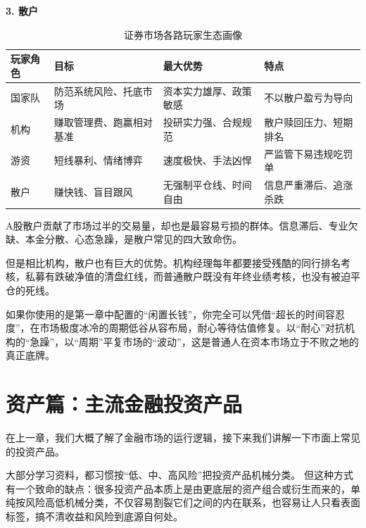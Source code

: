 \documentclass[12pt,openany]{book}
\newcommand{\subhead}[1]{%
    \par\vspace{0.5\baselineskip}%
    \noindent\textbf{#1}\par%
    \vspace{0.5\baselineskip}%
}
\begin{document}
\subhead{3. 散户}

\begin{table}[tbp]
    \centering
    \small
    \singlespacing
    \renewcommand{\arraystretch}{1.15}
    \caption{证券市场各路玩家生态画像}
    \label{tab:market_participants}
    \begin{tabularx}{\textwidth}{|>{\centering\arraybackslash\hsize=0.8\hsize}X|>{\centering\arraybackslash\hsize=1.0\hsize}X|>{\centering\arraybackslash\hsize=1.0\hsize}X|>{\centering\arraybackslash\hsize=1.2\hsize}X|}
        \hline
        玩家角色 & 目标 & 最大优势 & 特点 \\ \hline
        国家队 & 防范系统风险、托底市场 & 资本实力雄厚、政策敏感 & 不以散户盈亏为导向 \\ \hline
        机构 & 赚取管理费、跑赢相对基准 & 投研实力强、合规规范 & 散户赎回压力、短期排名 \\ \hline
        游资 & 短线暴利、情绪博弈 & 速度极快、手法凶悍 & 严监管下易违规吃罚单 \\ \hline
        散户 & 赚快钱、盲目跟风 & 无强制平仓线、时间自由 & 信息严重滞后、追涨杀跌 \\ \hline
    \end{tabularx}
\end{table}

A股散户贡献了市场过半的交易量，却也是最容易亏损的群体。信息滞后、专业欠缺、本金分散、心态急躁，是散户常见的四大致命伤。

但是相比机构，散户也有巨大的优势。机构经理每年都要接受残酷的同行排名考核，私募有跌破净值的清盘红线，而普通散户既没有年终业绩考核，也没有被迫平仓的死线。

如果你使用的是第一章中配置的“闲置长钱”，你完全可以凭借“超长的时间容忍度”，在市场极度冰冷的周期低谷从容布局，耐心等待估值修复。以“耐心”对抗机构的“急躁”，以“周期”平复市场的“波动”，这是普通人在资本市场立于不败之地的真正底牌。

\chapter{资产篇：主流金融投资产品}

在上一章，我们大概了解了金融市场的运行逻辑，接下来我们讲解一下市面上常见的投资产品。

大部分学习资料，都习惯按“低、中、高风险”把投资产品机械分类。
但这种方式有一个致命的缺点：很多投资产品本质上是由更底层的资产组合或衍生而来的，单纯按风险高低机械分类，不仅容易割裂它们之间的内在联系，也容易让人只看表面标签，搞不清收益和风险到底源自何处。
\end{document}

